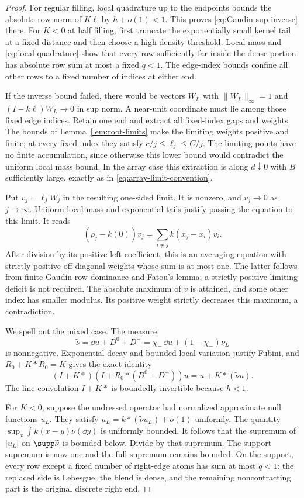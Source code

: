 \begin{proof}
For regular filling, local quadrature up to the endpoints bounds
the absolute row norm of $K\ell$ by $h+o(1)<1$.
This proves \eqref{eq:Gaudin-sup-inverse} there.
For $K<0$ at half filling, first truncate the exponentially small
kernel tail at a fixed distance and then choose a high density
threshold.  Local mass and \eqref{eq:local-quadrature} show that
every row sufficiently far inside the dense portion has absolute
row sum at most a fixed $q<1$.  The edge-index bounds confine all
other rows to a fixed number of indices at either end.

If the inverse bound failed, there would be vectors $W_L$ with
$\|W_L\|_\infty=1$ and
$(I-k\ell)W_L\to0$ in sup norm.  A near-unit coordinate must
lie among those fixed edge indices.  Retain one end and extract
all fixed-index gaps and weights.  The bounds of
Lemma~\ref{lem:root-limits} make the limiting weights positive
and finite; at every fixed index they satisfy
$c/j\le\ell_j\le C/j$.  The limiting points have no finite
accumulation, since otherwise this lower bound would contradict
the uniform local mass bound.
In the array case this extraction is along $d\downarrow0$ with
$B$ sufficiently large, exactly as in
\eqref{eq:array-limit-convention}.

Put $v_j=\ell_jW_j$ in the resulting one-sided limit.
It is nonzero, and $v_j\to0$ as $j\to\infty$.
Uniform local mass and exponential tails justify passing the
equation to this limit.  It reads
\[
 (\rho_j-k(0))v_j=\sum_{i\ne j}k(x_j-x_i)v_i.
\]
After division by its positive left coefficient, this is an
averaging equation with strictly positive off-diagonal weights
whose sum is at most one.  The latter follows from finite Gaudin
row dominance and Fatou's lemma; a strictly positive limiting
deficit is not required.  The absolute maximum of $v$ is attained,
and some other index has smaller modulus.  Its positive weight
strictly decreases this maximum, a contradiction.

We spell out the mixed case.  The measure
\[
 \widetilde\nu=\dd u+D^0+D^+
       =\chi_-\,\dd u+(1-\chi_-)\nu_L
\]
is nonnegative.  Exponential decay and bounded local variation
justify Fubini, and $R_0+K*R_0=K$ gives the exact identity
\begin{equation}\label{eq:undo-dressing}
 (I+K*)(I+R_0*(D^0+D^+))u
       =u+K*(\widetilde\nu u).
\end{equation}
The line convolution $I+K*$ is boundedly invertible because
$h<1$.

For $K<0$, suppose the undressed operator had normalized
approximate null functions $u_L$.  They satisfy
$u_L=k*(\widetilde\nu u_L)+o(1)$ uniformly.
The quantity
$\sup_x\int k(x-y)\widetilde\nu(\dd y)$ is uniformly bounded.
It follows that the supremum of $|u_L|$ on
$\supp\widetilde\nu$ is bounded below.  Divide by that supremum.
The support supremum is now one and the full supremum remains
bounded.  On the support, every row except a fixed number of
right-edge atoms has sum at most $q<1$: the replaced side is
Lebesgue, the blend is dense, and the remaining noncontracting
part is the original discrete right end.


\end{proof}
